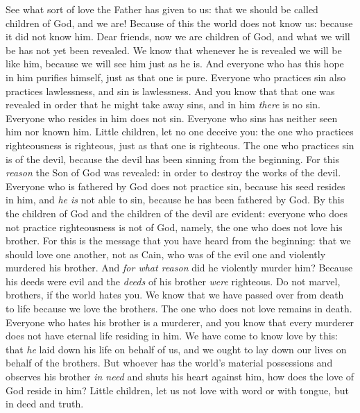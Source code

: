 \begin{biblechapter} %
\verse See what sort of love the Father has given to us: that we should be called children of God, and we are! Because of this the world does not know us: because it did not know him.
\verse Dear friends, now we are children of God, and what we will be has not yet been revealed. We know that whenever he is revealed we will be like him, because we will see him just as he is.
\verse And everyone who has this hope in him purifies himself, just as that one is pure.
\verse Everyone who practices sin also practices lawlessness, and sin is lawlessness.
\verse And you know that that one was revealed in order that he might take away sins, and in him \textit{there} is no sin.
\verse Everyone who resides in him does not sin. Everyone who sins has neither seen him nor known him.
\verse Little children, let no one deceive you: the one who practices righteousness is righteous, just as that one is righteous.
\verse The one who practices sin is of the devil, because the devil has been sinning from the beginning. For this \textit{reason} the Son of God was revealed: in order to destroy the works of the devil.
\verse Everyone who is fathered by God does not practice sin, because his seed resides in him, and \textit{he is} not able to sin, because he has been fathered by God.
\verse By this the children of God and the children of the devil are evident: everyone who does not practice righteousness is not of God, namely, the one who does not love his brother.
 For this is the message that you have heard from the beginning: that we should love one another,
\verse not as Cain, who was of the evil one and violently murdered his brother. And \textit{for what reason} did he violently murder him? Because his deeds were evil and the \textit{deeds} of his brother \textit{were} righteous.
\verse Do not marvel, brothers, if the world hates you.
\verse We know that we have passed over from death to life because we love the brothers. The one who does not love remains in death.
\verse Everyone who hates his brother is a murderer, and you know that every murderer does not have eternal life residing in him.
\verse We have come to know love by this: that \textit{he} laid down his life on behalf of us, and we ought to lay down our lives on behalf of the brothers.
\verse But whoever has the world’s material possessions and observes his brother \textit{in need} and shuts his heart against him, how does the love of God reside in him?
\verse Little children, let us not love with word or with tongue, but in deed and truth.

\end{biblechapter}
